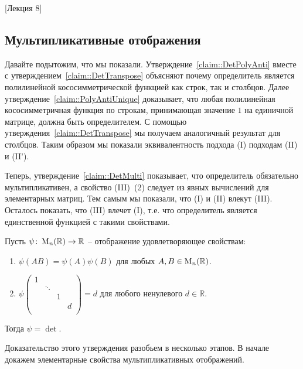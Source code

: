 [Лекция 8]


\subsection{Мультипликативные отображения}

Давайте подытожим, что мы показали.
Утверждение~\ref{claim::DetPolyAnti} вместе с утверждением~\ref{claim::DetTranspose} объясняют почему определитель является полилинейной кососимметрической функцией как строк, так и столбцов.
Далее утверждение~\ref{claim::PolyAntiUnique} доказывает, что любая полилинейная кососимметричная функция по строкам, принимающая значение $1$ на единичной матрице, должна быть определителем.
С помощью утверждения~\ref{claim::DetTranspose} мы получаем аналогичный результат для столбцов.
Таким образом мы показали эквивалентность подхода (I) подходам (II) и (II').

Теперь, утверждение~\ref{claim::DetMulti} показывает, что определитель обязательно мультипликативен, а свойство (III)~(2) следует из явных вычислений для элементарных матриц.
Тем самым мы показали, что (I) и (II) влекут (III).
Осталось показать, что (III) влечет (I), т.е. что определитель является единственной функцией с такими свойствами.

\begin{claim}
\label{claim::DetMultiUnique}
Пусть $\psi\colon \operatorname{M}_{n}(\mathbb R)\to \mathbb R$ -- отображение удовлетворяющее свойствам:
\begin{enumerate}
\item $\psi(AB) = \psi(A)\psi(B)$ для любых $A,B\in\operatorname{M}_{n}(\mathbb R)$.

\item 
$
\psi
\begin{pmatrix}
{1}&{}&{}&{}\\
{}&{\ddots}&{}&{}\\
{}&{}&{1}&{}\\
{}&{}&{}&{d}\\
\end{pmatrix}
= 
d
$ для любого ненулевого $d\in\mathbb R$.
\end{enumerate}
Тогда $\psi = \det$.
\end{claim}

Доказательство этого утверждения разобьем в несколько этапов.
В начале докажем элементарные свойства мультипликативных отображений.

